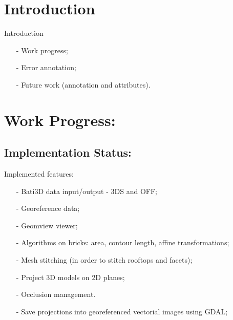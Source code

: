 \documentclass[9pt]{beamer}
\begin{document}
	\begin{frame}
		\tableofcontents
	\end{frame}



	\section*{Introduction}
	\begin{frame}{Introduction}
		\begin{itemize}
			\item[-] Work progress;
			\item[-] Error annotation;
			\item[-] Future work (annotation and attributes).
		\end{itemize}
	\end{frame}
	
		
	\section[Progress]{Work Progress:}

	\subsection[Implementation]{Implementation Status:}
	\begin{frame}{Implemented features:}
		\begin{itemize}
				\item[-] Bati3D data input/output - 3DS and OFF;
				\item[-] Georeference data;
				\item[-] Geomview viewer;
				\item[-] Algorithms on bricks: area, contour length, affine transformations;
				\item[-] Mesh stitching (in order to stitch rooftops and facets);
				\item[-] Project 3D models on 2D planes;
				\item[-] Occlusion management.
				\item[-] Save projections into georeferenced vectorial images using GDAL;

		\end{itemize}
	\end{frame}
\end{document}
